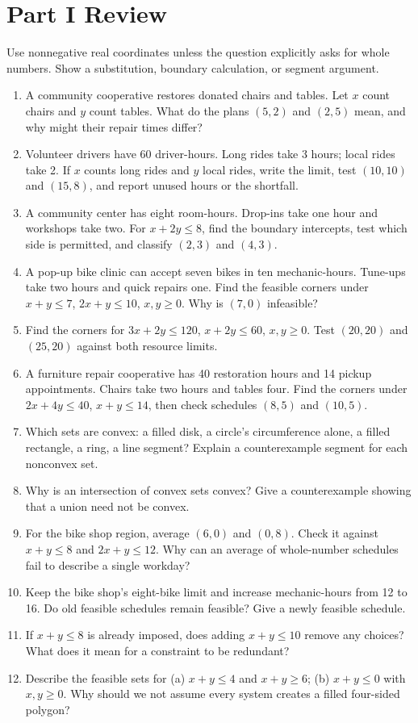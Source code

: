 \documentclass[11pt,letterpaper]{article}
\begin{document}
\section*{Part I Review}
Use nonnegative real coordinates unless the question explicitly asks for whole numbers. Show a substitution, boundary calculation, or segment argument.
\begin{enumerate}
\item A community cooperative restores donated chairs and tables. Let $x$ count chairs and $y$ count tables. What do the plans $(5,2)$ and $(2,5)$ mean, and why might their repair times differ?
\item Volunteer drivers have 60 driver-hours. Long rides take 3 hours; local rides take 2. If $x$ counts long rides and $y$ local rides, write the limit, test $(10,10)$ and $(15,8)$, and report unused hours or the shortfall.
\item A community center has eight room-hours. Drop-ins take one hour and workshops take two. For $x+2y\leq8$, find the boundary intercepts, test which side is permitted, and classify $(2,3)$ and $(4,3)$.
\item A pop-up bike clinic can accept seven bikes in ten mechanic-hours. Tune-ups take two hours and quick repairs one. Find the feasible corners under $x+y\leq7$, $2x+y\leq10$, $x,y\geq0$. Why is $(7,0)$ infeasible?
\item Find the corners for $3x+2y\leq120$, $x+2y\leq60$, $x,y\geq0$. Test $(20,20)$ and $(25,20)$ against both resource limits.
\item A furniture repair cooperative has 40 restoration hours and 14 pickup appointments. Chairs take two hours and tables four. Find the corners under $2x+4y\leq40$, $x+y\leq14$, then check schedules $(8,5)$ and $(10,5)$.
\item Which sets are convex: a filled disk, a circle's circumference alone, a filled rectangle, a ring, a line segment? Explain a counterexample segment for each nonconvex set.
\item Why is an intersection of convex sets convex? Give a counterexample showing that a union need not be convex.
\item For the bike shop region, average $(6,0)$ and $(0,8)$. Check it against $x+y\leq8$ and $2x+y\leq12$. Why can an average of whole-number schedules fail to describe a single workday?
\item Keep the bike shop's eight-bike limit and increase mechanic-hours from 12 to 16. Do old feasible schedules remain feasible? Give a newly feasible schedule.
\item If $x+y\leq8$ is already imposed, does adding $x+y\leq10$ remove any choices? What does it mean for a constraint to be redundant?
\item Describe the feasible sets for (a) $x+y\leq4$ and $x+y\geq6$; (b) $x+y\leq0$ with $x,y\geq0$. Why should we not assume every system creates a filled four-sided polygon?
\end{enumerate}
\end{document}
